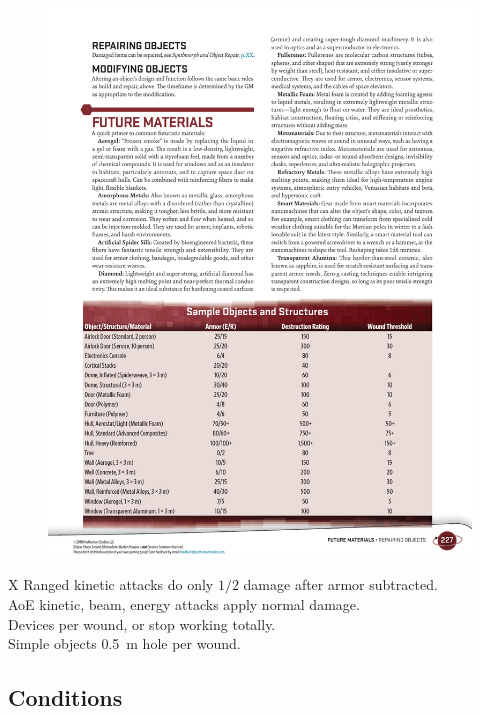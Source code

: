 \begin{figure}[h!]%
   \includegraphics[scale=0.71]{gfx/combat-objects}%
\end{figure}%

\begin{eptable}{ X }
   Ranged kinetic attacks do only $1/2$ damage after armor subtracted.\\
   AoE kinetic, beam, energy attacks apply normal damage.\\
   Devices  per wound, or stop working totally. \\
   Simple objects \SI{.5}{m} hole per wound.
\end{eptable}


\bigskip

\subsection*{Conditions}


